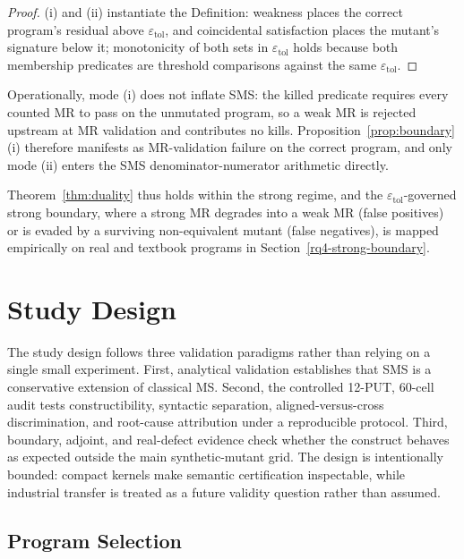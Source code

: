 \documentclass[manuscript,screen,review]{acmart}
\begin{document}
\begin{proof}
(i) and (ii) instantiate the Definition: weakness
places the correct program's residual above $\varepsilon_{\mathrm{tol}}$,
and coincidental satisfaction places the mutant's signature below it;
monotonicity of both sets in $\varepsilon_{\mathrm{tol}}$ holds because
both membership predicates are threshold comparisons against the same
$\varepsilon_{\mathrm{tol}}$.
\end{proof}

Operationally, mode (i) does not inflate SMS: the killed predicate
requires every counted MR to pass on the unmutated program, so a weak
MR is rejected upstream at MR validation and contributes no kills.
Proposition~\ref{prop:boundary}(i) therefore manifests as
MR-validation failure on the correct program, and only mode (ii)
enters the SMS denominator-numerator arithmetic directly.

Theorem~\ref{thm:duality} thus holds within the strong regime, and the
$\varepsilon_{\mathrm{tol}}$-governed strong boundary, where a strong
MR degrades into a weak MR (false positives) or is evaded by a surviving
non-equivalent mutant (false negatives), is mapped empirically on real
and textbook programs in Section~\ref{rq4-strong-boundary}.


\section{Study Design}\label{experimental-subjects-and-operator-framework}

The study design follows three validation paradigms rather than relying
on a single small experiment. First, analytical validation establishes
that SMS is a conservative extension of classical MS. Second, the
controlled 12-PUT, 60-cell audit tests constructibility, syntactic
separation, aligned-versus-cross discrimination, and root-cause
attribution under a reproducible protocol. Third, boundary, adjoint, and
real-defect evidence check whether the construct behaves as expected
outside the main synthetic-mutant grid. The design is intentionally
bounded: compact kernels make semantic certification inspectable, while
industrial transfer is treated as a future validity question rather than
assumed.

\subsection{Program Selection}\label{put-selection-12-puts-4-classes}
\end{document}
